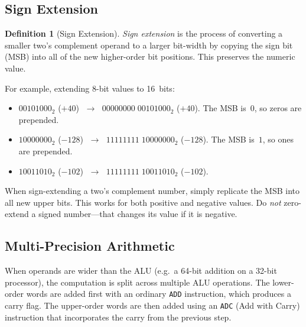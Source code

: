 \documentclass[11pt, a4paper, notitlepage]{report}
\theoremstyle{definition}
\newtheorem{definition}[theorem]{Definition}
\theoremstyle{remark}
\theoremstyle{definition}
\begin{document}
\subsection{Sign Extension}
\label{sec:sign-extension}

\begin{definition}[Sign Extension]
  \label{def:sign-extension}
  \emph{Sign extension} is the process of converting a smaller two's complement operand to a larger bit-width by copying the sign bit (MSB) into all of the new higher-order bit positions. This preserves the numeric value.
\end{definition}

For example, extending 8-bit values to 16~bits:
\begin{itemize}
  \item $00101000_2$ ($+40$) $\;\longrightarrow\;$ $00000000\;00101000_2$ ($+40$). The MSB is~$0$, so zeros are prepended.
  \item $10000000_2$ ($-128$) $\;\longrightarrow\;$ $11111111\;10000000_2$ ($-128$). The MSB is~$1$, so ones are prepended.
  \item $10011010_2$ ($-102$) $\;\longrightarrow\;$ $11111111\;10011010_2$ ($-102$).
\end{itemize}

\begin{examtip}[title={Exam Tip: Sign Extension Rule}]
  When sign-extending a two's complement number, simply replicate the MSB into all new upper bits. This works for both positive and negative values. Do \emph{not} zero-extend a signed number---that changes its value if it is negative.
\end{examtip}

\subsection{Multi-Precision Arithmetic}
\label{sec:multi-precision}

When operands are wider than the ALU (e.g.\ a 64-bit addition on a 32-bit processor), the computation is split across multiple ALU operations. The lower-order words are added first with an ordinary \texttt{ADD} instruction, which produces a carry flag. The upper-order words are then added using an \texttt{ADC} (Add with Carry) instruction that incorporates the carry from the previous step.
\end{document}
